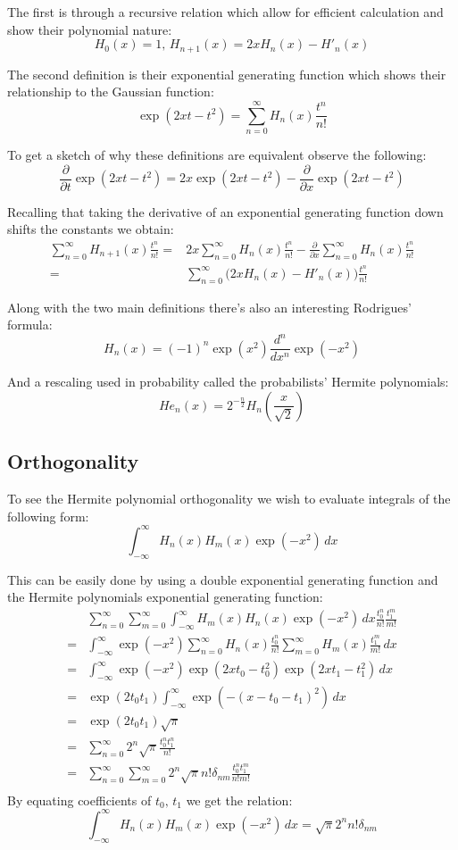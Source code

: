 \documentclass[12pt]{report}
\begin{document}
The first is through a recursive relation which allow for efficient calculation and show their polynomial nature:
\[H_0(x) = 1,\, H_{n+1}(x) = 2xH_n(x)-H'_n(x)\]

The second definition is their exponential generating function which shows their relationship to the Gaussian function:
\[\exp(2xt-t^2) = \sum_{n=0}^{\infty}H_n(x)\frac{t^n}{n!}\]

To get a sketch of why these definitions are equivalent observe the following:
\[\frac{\partial}{\partial t}\exp(2xt-t^2) = 2x\exp(2xt-t^2)-\frac{\partial}{\partial x}\exp(2xt-t^2) \]

Recalling that taking the derivative of an exponential generating function down shifts the constants we obtain:
\begin{equation*}
\begin{aligned}
\sum_{n=0}^\infty H_{n+1}(x)\frac{t^n}{n!} =& 2x\sum_{n=0}^{\infty}H_n(x)\frac{t^n}{n!}-\frac{\partial}{\partial x}\sum_{n=0}^\infty H_n(x)\frac{t^n}{n!}\\
=& \sum_{n=0}^\infty\bigg(2xH_n(x)-H'_n(x)\bigg)\frac{t^n}{n!}
\end{aligned}
\end{equation*}

Along with the two main definitions there's also an interesting Rodrigues' formula:
\[H_n(x) = (-1)^n\exp(x^2)\frac{d^n}{d x^n}\exp(-x^2)\]

And a rescaling used in probability called the probabilists' Hermite polynomials:
\[He_n(x) = 2^{-\frac{n}{2}}H_n\left(\frac{x}{\sqrt{2}}\right)\]
\subsection{Orthogonality} 
To see the Hermite polynomial orthogonality we wish to evaluate integrals of the following form:
\[\int_{-\infty}^{\infty}H_n(x)H_m(x)\exp(-x^2)\,dx\]

This can be easily done by using a double exponential generating function and the Hermite polynomials exponential generating function:
\begin{equation*}
\begin{aligned}
&\sum_{n=0}^{\infty}\sum_{m=0}^{\infty}\int_{-\infty}^{\infty}H_m(x)H_n(x)\exp(-x^2)\,dx\frac{t_0^n}{n!}\frac{t_1^m}{m!}\\
=&\int_{-\infty}^{\infty}\exp(-x^2)\sum_{n=0}^{\infty}H_n(x)\frac{t_0^n}{n!}\sum_{m=0}^{\infty}H_m(x)\frac{t_1^m}{m!}\,dx \\
=&\int_{-\infty}^{\infty}\exp(-x^2)\exp(2xt_0-t_0^2)\exp(2xt_1-t_1^2)\,dx \\
=&\exp(2t_0t_1)\int_{-\infty}^{\infty}\exp(-(x-t_0-t_1)^2)\,dx\\
=&\exp(2t_0t_1)\sqrt{\pi}\\
=&\sum_{n=0}^{\infty}2^n\sqrt{\pi}\frac{t_0^nt_1^n}{n!} \\
=&\sum_{n=0}^{\infty}\sum_{m=0}^{\infty}2^n\sqrt{\pi}n!\delta_{nm}\frac{t_0^nt_1^m}{n!m!} \\
\end{aligned}
\end{equation*}
By equating coefficients of $t_0,\,t_1$ we get the relation:
\[\int_{-\infty}^\infty H_n(x)H_m(x)\exp(-x^2)\,dx = \sqrt{\pi}2^nn!\delta_{nm}\]
\end{document}
